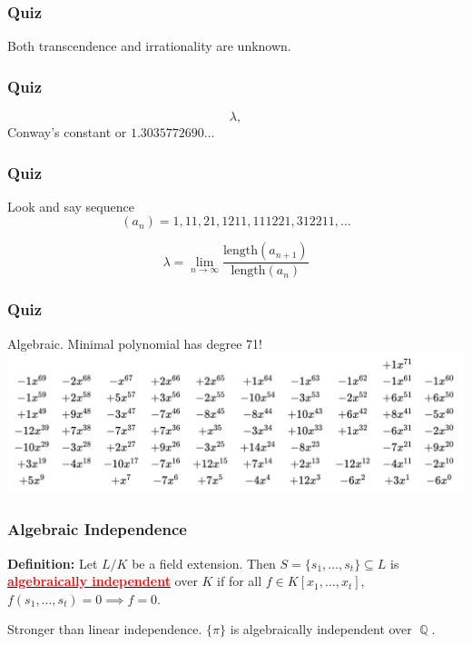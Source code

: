 \documentclass{beamer}
\newcommand{\vocab}[1]{\underline{\textbf{\textcolor{red}{#1}}}}
\DeclareMathOperator{\Q}{\mathbb{Q}}
\begin{document}
    \begin{frame}
        \frametitle{Quiz}
        \begin{center}
            Both transcendence and irrationality are unknown.
        \end{center}
    \end{frame}

    \begin{frame}
        \frametitle{Quiz}
        \begin{center}
            \[\lambda,\] 
            Conway's constant or $1.3035772690\ldots$ \\
        \end{center}
    \end{frame}

     \begin{frame}
        \frametitle{Quiz}
        \begin{center}
 
            Look and say sequence \[(a_n) = 1, 11, 21, 1211, 111221, 312211, \ldots\]

            \[\lambda = \lim\limits_{n \to \infty} \frac{\text{length}(a_{n+1})}{\text{length}(a_{n})}\]
        \end{center}
    \end{frame}

    \begin{frame}
        \frametitle{Quiz}
        \begin{center}
            Algebraic. Minimal polynomial has degree 71!
            \includegraphics[scale=0.35]{img/mp.png}
        \end{center}
    \end{frame}

    \begin{frame}
        \frametitle{Algebraic Independence}
        \begin{center}
            \begin{mybox}
                \textbf{Definition:} Let $L/K$ be a field extension. Then $S = \{s_1, \ldots, s_t\} \subseteq L$ is \vocab{algebraically independent} over $K$ if for all $f \in K[x_1, \ldots, x_t]$, $f(s_1, \ldots, s_t) = 0 \implies f = 0$.
            \end{mybox}
            Stronger than linear independence. $\{\pi\}$ is algebraically independent over $\Q$.\par
        \end{center}
    \end{frame}
\end{document}
